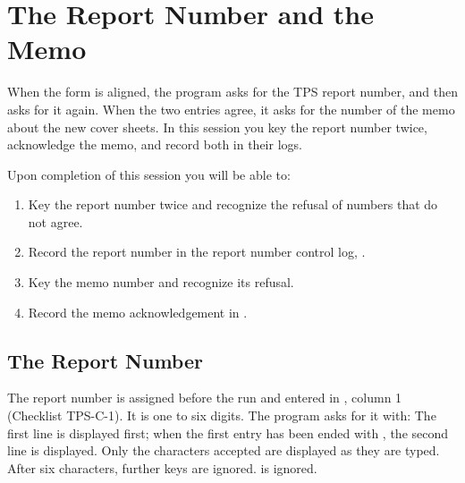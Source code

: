 \chapter{The Report Number and the Memo}

When the form is aligned, the program asks for the
TPS report number, and then asks for it again.  When the two entries agree,
it asks for the number of the memo about the new cover sheets.  In this
session you key the report number twice, acknowledge the memo, and record
both in their logs.

Upon completion of this session you will be able to:
\begin{enumerate}
\item Key the report number twice and recognize the refusal of numbers that
  do not agree.
\item Record the report number in the report number control log, .
\item Key the memo number and recognize its refusal.
\item Record the memo acknowledgement in .
\end{enumerate}

\section{The Report Number}
The report number is assigned before the run and entered in ,
column 1 (Checklist TPS-C-1).  It is one to six digits.  The program asks
for it with:
The first line is displayed first; when the first entry has been ended with
, the second line is displayed.  Only the characters accepted are
displayed as they are typed.  After six characters, further keys are
ignored.   is ignored.

